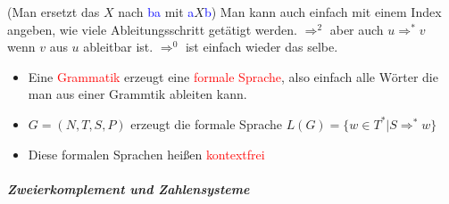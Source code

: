 \documentclass[12pt]{article}
\begin{document}
\begin{flushleft}
\begin{itemize}
        (Man ersetzt das $X$ nach \textcolor{blue}{ba} mit \textcolor{blue}{a}$X$\textcolor{blue}{b}) \linebreak
        \linebreak
        Man kann auch einfach mit einem Index angeben, wie viele Ableitungsschritt getätigt werden. \linebreak
        $\Rightarrow^2$ aber auch $u \Rightarrow^\ast v$ wenn $v$ aus $u$ ableitbar ist. $\Rightarrow^0$ ist einfach wieder das selbe.
        \begin{itemize}
            \item Eine \textcolor{red}{Grammatik} erzeugt eine \textcolor{red}{formale Sprache}, also einfach alle Wörter die man aus einer Grammtik ableiten kann.
            \item $G = (N,T,S,P)$ erzeugt die formale Sprache $L(G) = \{w \in T^* | S \Rightarrow^\ast w\}$
            \item Diese formalen Sprachen heißen \textcolor{red}{kontextfrei}
        \end{itemize}
    \end{itemize}
\end{flushleft}
\subparagraph{\large Zweierkomplement und Zahlensysteme}
\normalsize
\end{document}
